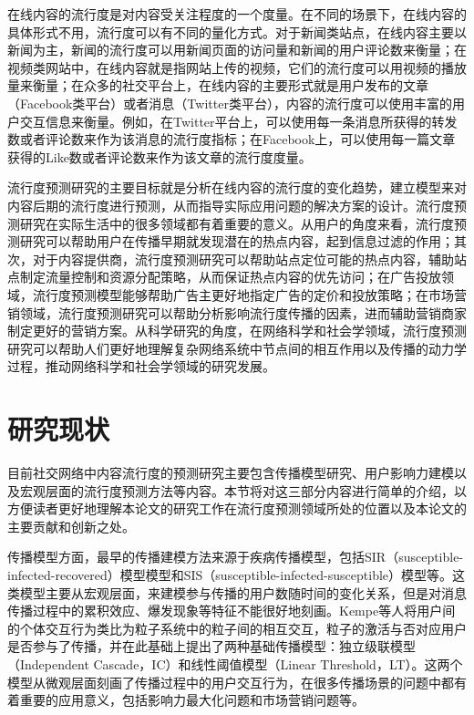 在线内容的流行度是对内容受关注程度的一个度量。在不同的场景下，在线内容的具体形式不用，流行度可以有不同的量化方式。对于新闻类站点，在线内容主要以新闻为主，新闻的流行度可以用新闻页面的访问量和新闻的用户评论数来衡量；在视频类网站中，在线内容就是指网站上传的视频，它们的流行度可以用视频的播放量来衡量；在众多的社交平台上，在线内容的主要形式就是用户发布的文章（Facebook类平台）或者消息（Twitter类平台），内容的流行度可以使用丰富的用户交互信息来衡量。例如，在Twitter平台上，可以使用每一条消息所获得的转发数或者评论数来作为该消息的流行度指标；在Facebook上，可以使用每一篇文章获得的Like数或者评论数来作为该文章的流行度度量。

流行度预测研究的主要目标就是分析在线内容的流行度的变化趋势，建立模型来对内容后期的流行度进行预测，从而指导实际应用问题的解决方案的设计。流行度预测研究在实际生活中的很多领域都有着重要的意义。从用户的角度来看，流行度预测研究可以帮助用户在传播早期就发现潜在的热点内容\citep{tatar2014popularity,tatar2012ranking}，起到信息过滤的作用；其次，对于内容提供商，流行度预测研究可以帮助站点定位可能的热点内容，辅助站点制定流量控制和资源分配策略\citep{chen2003popularity,famaey2013towards}，从而保证热点内容的优先访问；在广告投放领域，流行度预测模型能够帮助广告主更好地指定广告的定价和投放策略；在市场营销领域，流行度预测研究可以帮助分析影响流行度传播的因素，进而辅助营销商家制定更好的营销方案。从科学研究的角度，在网络科学和社会学领域，流行度预测研究可以帮助人们更好地理解复杂网络系统中节点间的相互作用以及传播的动力学过程，推动网络科学和社会学领域的研究发展。

\section{研究现状}
目前社交网络中内容流行度的预测研究主要包含传播模型研究、用户影响力建模以及宏观层面的流行度预测方法等内容。本节将对这三部分内容进行简单的介绍，以方便读者更好地理解本论文的研究工作在流行度预测领域所处的位置以及本论文的主要贡献和创新之处。

传播模型方面，最早的传播建模方法来源于疾病传播模型，包括SIR（susceptible-infected-recovered）模型模型和SIS（susceptible-infected-susceptible）模型\citep{hill2010infectious}等。这类模型主要从宏观层面，来建模参与传播的用户数随时间的变化关系，但是对消息传播过程中的累积效应\citep{leskovec2006patterns}、爆发现象\citep{barabasi05}等特征不能很好地刻画。Kempe等人将用户间的个体交互行为类比为粒子系统中的粒子间的相互交互，粒子的激活与否对应用户是否参与了传播，并在此基础上提出了两种基础传播模型：独立级联模型（Independent Cascade，IC）和线性阈值模型（Linear Threshold，LT）\citep{kempe2003maximizing}。这两个模型从微观层面刻画了传播过程中的用户交互行为，在很多传播场景的问题中都有着重要的应用意义，包括影响力最大化问题\citep{wang2012scalable,cheng2013staticgreedy}和市场营销问题\citep{kim2014ct}等。

